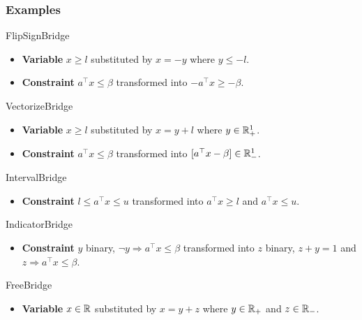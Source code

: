 \documentclass{beamer}
\begin{document}
  \begin{frame}[allowframebreaks]
    \frametitle{Examples}
    \begin{block}{FlipSignBridge}
      \begin{itemize}
        \item \textbf{Variable} $x \ge l$ substituted by $x = -y$ where $y \le -l$.
        \item \textbf{Constraint} $a^\top x \le \beta$ transformed into $-a^\top x \ge -\beta$.
      \end{itemize}
    \end{block}
    \begin{block}{VectorizeBridge}
      \begin{itemize}
        \item \textbf{Variable} $x \ge l$ substituted by $x = y + l$ where $y \in \mathbb{R}^1_+$.
        \item \textbf{Constraint} $a^\top x \le \beta$ transformed into $[a^\top x - \beta] \in \mathbb{R}^1_-$.
      \end{itemize}
    \end{block}
    \begin{block}{IntervalBridge}
      \begin{itemize}
        \item \textbf{Constraint} $l \le a^\top x \le u$ transformed into $a^\top x \ge l$ and $a^\top x \le u$.
      \end{itemize}
    \end{block}
    \begin{block}{IndicatorBridge}
      \begin{itemize}
        \item \textbf{Constraint} $y$ binary, $\neg y \Rightarrow a^\top x \le \beta$ transformed into $z$ binary, $z + y = 1$ and $z \Rightarrow a^\top x \le \beta$.
      \end{itemize}
    \end{block}
    \begin{block}{FreeBridge}
      \begin{itemize}
        \item \textbf{Variable} $x \in \mathbb{R}$ substituted by $x = y + z$ where $y \in \mathbb{R}_+$ and $z \in \mathbb{R}_-$.
      \end{itemize}
    \end{block}


\end{frame}
\end{document}
